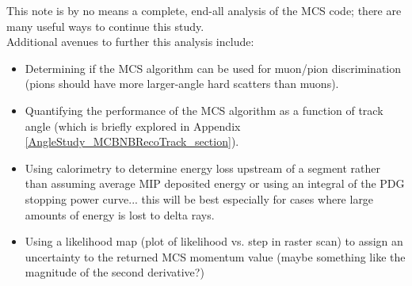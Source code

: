 This note is by no means a complete, end-all analysis of the MCS code; there are many useful ways to continue this study.\\

Additional avenues to further this analysis include:
\begin{itemize}
	\item Determining if the MCS algorithm can be used for muon/pion discrimination (pions should have more larger-angle hard scatters than muons).
	\item Quantifying the performance of the MCS algorithm as a function of track angle (which is briefly explored in Appendix \ref{AngleStudy_MCBNBRecoTrack_section}).
	\item Using calorimetry to determine energy loss upstream of a segment rather than assuming average MIP deposited energy or using an integral of the PDG stopping power curve... this will be best especially for cases where large amounts of energy is lost to delta rays.
	\item Using a likelihood map (plot of likelihood vs. step in raster scan) to assign an uncertainty to the returned MCS momentum value (maybe something like the magnitude of the second derivative?)
\end{itemize}


